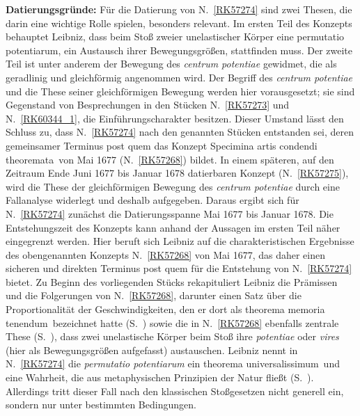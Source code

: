 \begin{ledgroup}
\footnotesize
\pstart
\noindent%
\textbf{Datierungsgründe:}
Für die Datierung von N.~\ref{RK57274} sind zwei Thesen, die darin eine wichtige Rolle spielen, besonders relevant.
%
Im ersten Teil des Konzepts behauptet Leibniz, dass beim Stoß zweier unelastischer Körper eine \glqq permutatio potentiarum\grqq, ein Austausch ihrer Bewegungsgrößen, stattfinden muss.
%
Der zweite Teil ist unter anderem der Bewegung des \textit{centrum potentiae} gewidmet, die als geradlinig und gleichförmig angenommen wird.
\pend
%
\pstart
Der Begriff des \textit{centrum potentiae} und die These seiner gleichförmigen Bewegung werden hier vorausgesetzt; 
%
sie sind Gegenstand von Besprechungen in den Stücken N.~\ref{RK57273} und N.~\ref{RK60344_1}, die Einführungscharakter besitzen.
%
Dieser Umstand lässt den Schluss zu, dass N.~\ref{RK57274} nach den genannten Stücken entstanden sei, 
%
deren gemeinsamer Terminus post quem das Konzept \glqq Specimina artis condendi theoremata\grqq\ von Mai 1677 (N.~\ref{RK57268})  bildet.
%
In einem späteren, auf den Zeitraum Ende Juni 1677 bis Januar 1678  datierbaren Konzept (N.~\ref{RK57275}),
%
wird die These der gleichförmigen Bewegung des \textit{centrum potentiae} durch eine Fallanalyse widerlegt und deshalb aufgegeben.
%
Daraus ergibt sich für N.~\ref{RK57274} zunächst die Datierungsspanne Mai 1677 bis Januar 1678.
\pend
%
\pstart
Die Entstehungszeit des Konzepts kann anhand der Aussagen im ersten Teil näher eingegrenzt werden.
%
Hier beruft sich Leibniz auf die charakteristischen Ergebnisse des obengenannten Konzepts 
%
N.~\ref{RK57268} von Mai 1677, das daher einen sicheren und direkten Terminus post quem für die Entstehung von N.~\ref{RK57274} bietet.
%
Zu Beginn des vorliegenden Stücks rekapituliert Leibniz die Prämissen und die Folgerungen von N.~\ref{RK57268},
%
darunter einen Satz über die Proportionalität der Geschwindigkeiten, den er dort
%
als \glqq theorema memoria tenendum\grqq\ bezeichnet hatte (S.~)
%
sowie die in N.~\ref{RK57268} ebenfalls zentrale These (S.~), dass zwei unelastische Körper beim Stoß
%
ihre \textit{potentiae} oder \textit{vires} (hier als Bewegungsgrößen aufgefasst) 
%
austauschen.
%
Leibniz nennt in N.~\ref{RK57274} die \textit{permutatio potentiarum} ein \glqq theorema universalissimum\grqq\ und eine Wahrheit, die aus metaphysischen Prinzipien der Natur fließt (S.~).
%
Allerdings tritt dieser Fall nach den klassischen Stoßgesetzen nicht generell ein, sondern nur unter bestimmten Bedingungen.

\end{ledgroup}
